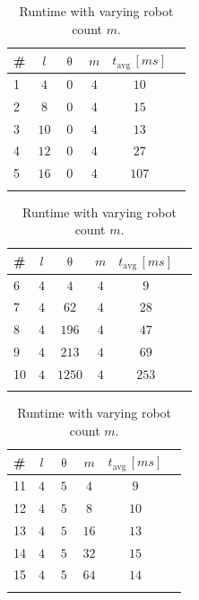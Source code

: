 \documentclass{svproc}
\begin{document}
\begin{table}[!htb]%
\begin{minipage}{.3\textwidth}
    \centering
    \begin{tabular}{|l|c|c|c|c|r|}
        \hline
         \#&$l$&$\uptheta$ &$m$&$t_{\text{avg}}\,[\si{ms}]$  \\ \hline
         1 & $4$ & $0$ & $4$ & $10$\\ \hline
         2 & $8$ & $0$ & $4$ & $15$\\ \hline
         3 & $10$ & $0$ & $4$ & $13$ \\ \hline
         4 & $12$ & $0$ & $4$ & $27$ \\ \hline
         5 & $16$ & $0$ & $4$ & $107$ \\ \hline
         \multicolumn{5}{c}{}\\
    \end{tabular}
    \caption{Runtime with varying curve count $l$.}
    \label{tab:curveCountScalability}
\end{minipage}
\hfill
\begin{minipage}{.3\textwidth}
    \centering
    \begin{tabular}{|l|c|c|c|c|r|}
        \hline
         \#&$l$&$\uptheta$ &$m$&$t_{\text{avg}}\,[\si{ms}]$  \\ \hline
         6 & $4$ & $4$ & $4$ & $9$ \\ \hline
         7 & $4$ & $62$ & $4$ & $28$ \\ \hline
         8 & $4$ & $196$ & $4$ & $47$  \\ \hline
         9 & $4$ & $213$ & $4$ & $69$  \\ \hline
         10 & $4$ & $1250$ & $4$ & $253$  \\ \hline
         \multicolumn{5}{c}{}\\
    \end{tabular}
    \caption{Runtime with varying occupied cells $\uptheta$.}
    \label{tab:obstacleCountScalability}
\end{minipage}
\hfill
\begin{minipage}{.3\textwidth}
    \centering
    \begin{tabular}{|l|c|c|c|c|r|}
        \hline
         \#&$l$&$\uptheta$ &$m$&$t_{\text{avg}}\,[\si{ms}]$  \\ \hline
         11 & $4$ & $5$ & $4$ &$9$\\ \hline
         12 & $4$ & $5$ & $8$ & $10$ \\ \hline
         13 & $4$ & $5$ & $16$ & $13$ \\ \hline
         14 & $4$ & $5$ & $32$ & $15$  \\ \hline
         15 & $4$ & $5$ & $64$ & $14$  \\ \hline
         \multicolumn{5}{c}{}\\
    \end{tabular}
    \caption{Runtime with varying robot count $m$.}
    \label{tab:robotCountScalability}
\end{minipage}
\vspace{-10mm}
\end{table}
\end{document}
